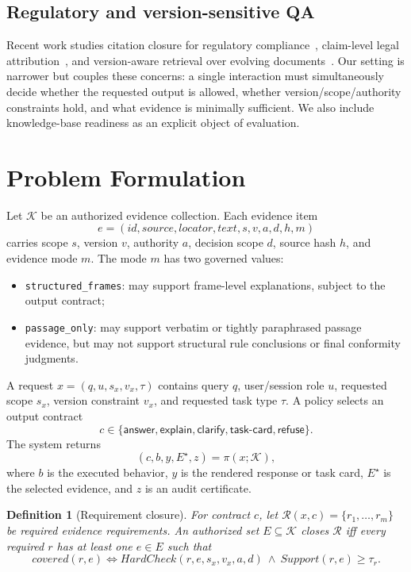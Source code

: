 \documentclass[11pt]{article}
\newtheorem{definition}{Definition}
\begin{document}
\subsection{Regulatory and version-sensitive QA}

Recent work studies citation closure for regulatory compliance~\citep{ju2026citationclosure}, claim-level legal attribution~\citep{demir2026citationsmislead}, and version-aware retrieval over evolving documents~\citep{huwiler2025versionrag}. Our setting is narrower but couples these concerns: a single interaction must simultaneously decide whether the requested output is allowed, whether version/scope/authority constraints hold, and what evidence is minimally sufficient. We also include knowledge-base readiness as an explicit object of evaluation.

\section{Problem Formulation}
\label{sec:problem}

Let $\mathcal{K}$ be an authorized evidence collection. Each evidence item
\[
e=(\mathit{id},\mathit{source},\mathit{locator},\mathit{text},s,v,a,d,h,m)
\]
carries scope $s$, version $v$, authority $a$, decision scope $d$, source hash $h$, and evidence mode $m$. The mode $m$ has two governed values:
\begin{itemize}[nosep]
  \item \texttt{structured\_frames}: may support frame-level explanations, subject to the output contract;
  \item \texttt{passage\_only}: may support verbatim or tightly paraphrased passage evidence, but may not support structural rule conclusions or final conformity judgments.
\end{itemize}

A request $x=(q,u,s_x,v_x,\tau)$ contains query $q$, user/session role $u$, requested scope $s_x$, version constraint $v_x$, and requested task type $\tau$. A policy selects an output contract
\[
c\in\{\textsf{answer},\textsf{explain},\textsf{clarify},\textsf{task-card},\textsf{refuse}\}.
\]
The system returns
\[
(c,b,y,E^\star,z)=\pi(x;\mathcal{K}),
\]
where $b$ is the executed behavior, $y$ is the rendered response or task card, $E^\star$ is the selected evidence, and $z$ is an audit certificate.

\begin{definition}[Requirement closure]\label{def:closure}
For contract $c$, let $\mathcal{R}(x,c)=\{r_1,\ldots,r_m\}$ be required evidence requirements. An authorized set $E\subseteq\mathcal{K}$ closes $\mathcal{R}$ iff every required $r$ has at least one $e\in E$ such that
\[
\mathit{covered}(r,e) \iff
\mathit{HardCheck}(r,e,s_x,v_x,a,d)\ \wedge\
\mathit{Support}(r,e)\ge\tau_r .
\]
\end{definition}
\end{document}
